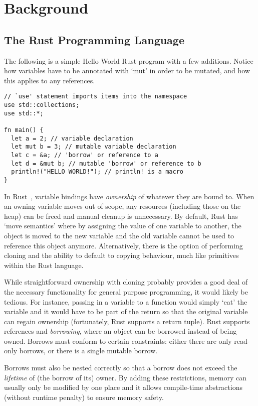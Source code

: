 \section{Background}\label{C:back} 

\subsection{The Rust Programming Language}

The following is a simple Hello World Rust program with a few additions. Notice how variables have to be annotated with `mut' in order to be mutated, and how this applies to any references.

\begin{verbatim}
// `use' statement imports items into the namespace
use std::collections;
use std::*;

fn main() {
  let a = 2; // variable declaration
  let mut b = 3; // mutable variable declaration
  let c = &a; // 'borrow' or reference to a
  let d = &mut b; // mutable 'borrow' or reference to b
  println!("HELLO WORLD!"); // println! is a macro
}
\end{verbatim}

In Rust~\cite{doc15}, variable bindings have \textit{ownership} of whatever they are bound to. When an owning variable moves out of scope, any resources (including those on the heap) can be freed and manual cleanup is unnecessary. By default, Rust has `move semantics' where by assigning the value of one variable to another, the object is moved to the new variable and the old variable cannot be used to reference this object anymore. Alternatively, there is the option of performing cloning and the ability to default to copying behaviour, much like primitives within the Rust language.

While straightforward ownership with cloning probably provides a good deal of the necessary functionality for general purpose programming, it would likely be tedious. For instance, passing in a variable to a function would simply `eat' the variable and it would have to be part of the return so that the original variable can regain ownership (fortunately, Rust supports a return tuple). Rust supports references and \textit{borrowing}, where an object can be borrowed instead of being owned. Borrows must conform to certain constraints: either there are only read-only borrows, or there is a single mutable borrow.

Borrows must also be nested correctly so that a borrow does not exceed the \textit{lifetime} of (the borrow of its) owner. By adding these restrictions, memory can usually only be modified by one place and it allows compile-time abstractions (without runtime penalty) to ensure memory safety.

